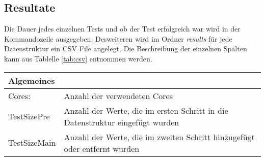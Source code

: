 \subsection{Resultate}
Die Dauer jedes einzelnen Tests und ob der Test erfolgreich war wird in der Kommandozeile ausgegeben. Desweiteren wird
im Ordner \textit{results} für jede Datenstruktur ein CSV File angelegt. Die Beschreibung der einzelnen 
Spalten kann aus Tablelle \ref{tab:csv} entnommen werden.
\begin{table}[H]

	\begin{tabular}{ |m{2.5cm}|  m{13cm}| } 

		\hline
	\multicolumn{2}{|l|}{\textbf{Algemeines}}  \\  \hline
	 Cores: & 		Anzahl der verwendeten Cores    \\ \hline
	 TestSizePre& 	Anzahl der Werte, die im ersten Schritt in die Datenstruktur eingefügt wurden\\ \hline
	 TestSizeMain& 	Anzahl der Werte, die im zweiten Schritt hinzugefügt oder entfernt wurden\\ \hline
	 

\end{tabular}
\end{table}
